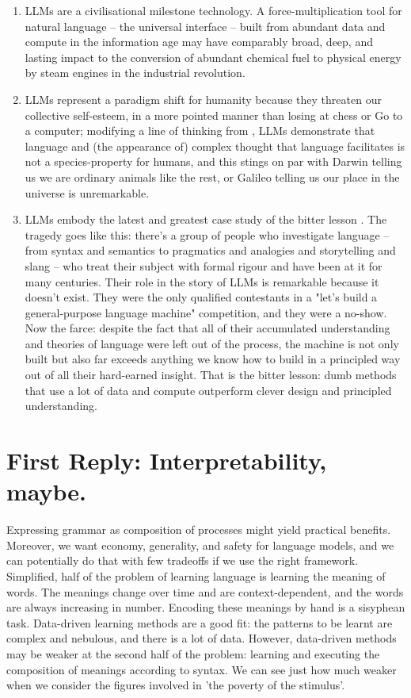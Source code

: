 \begin{enumerate}
\item{
LLMs are a civilisational milestone technology. A force-multiplication tool for natural language -- the universal interface -- built from abundant data and compute in the information age may have comparably broad, deep, and lasting impact to the conversion of abundant chemical fuel to physical energy by steam engines in the industrial revolution.
}
\item{
LLMs represent a paradigm shift for humanity because they threaten our collective self-esteem, in a more pointed manner than losing at chess or Go to a computer; modifying a line of thinking from \citep{floridiFourthRevolutionHow2014}, LLMs demonstrate that language and (the appearance of) complex thought that language facilitates is not a species-property for humans, and this stings on par with Darwin telling us we are ordinary animals like the rest, or Galileo telling us our place in the universe is unremarkable.
}
\item{
LLMs embody the latest and greatest case study of the bitter lesson \citep{suttonBitterLesson2019}. The tragedy goes like this: there's a group of people who investigate language -- from syntax and semantics to pragmatics and analogies and storytelling and slang -- who treat their subject with formal rigour and have been at it for many centuries. Their role in the story of LLMs is remarkable because it doesn't exist. They were the only qualified contestants in a "let's build a general-purpose language machine" competition, and they were a no-show. Now the farce: despite the fact that all of their accumulated understanding and theories of language were left out of the process, the machine is not only built but also far exceeds anything we know how to build in a principled way out of all their hard-earned insight. That is the bitter lesson: dumb methods that use a lot of data and compute outperform clever design and principled understanding.
}
\end{enumerate}

\section{\textbf{First Reply:} Interpretability, maybe.}

Expressing grammar as composition of processes might yield practical benefits. Moreover, we want economy, generality, and safety for language models, and we can potentially do that with few tradeoffs if we use the right framework. Simplified, half of the problem of learning language is learning the meaning of words. The meanings change over time and are context-dependent, and the words are always increasing in number. Encoding these meanings by hand is a sisyphean task. Data-driven learning methods are a good fit: the patterns to be learnt are complex and nebulous, and there is a lot of data. However, data-driven methods may be weaker at the second half of the problem: learning and executing the composition of meanings according to syntax. We can see just how much weaker when we consider the figures involved in 'the poverty of the stimulus'.

